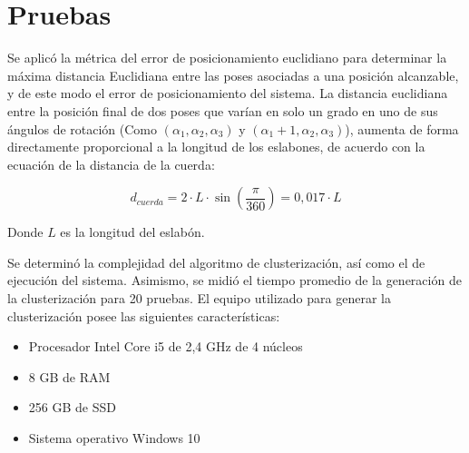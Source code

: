 \section{Pruebas}

Se aplicó la métrica del error de posicionamiento euclidiano para determinar la máxima distancia Euclidiana entre las poses asociadas a una posición alcanzable, y de este modo el error de posicionamiento del sistema. La distancia euclidiana entre la posición final de dos poses que varían en solo un grado en uno de sus ángulos de rotación (Como $(\alpha_1,\alpha_2,\alpha_3)$ y $(\alpha_1 + 1, \alpha_2, \alpha_3)$), aumenta de forma directamente proporcional a la longitud de los eslabones, de acuerdo con la ecuación de la distancia de la cuerda:

\begin{equation}
	d_{cuerda} = 2 \cdot L \cdot \sin(\frac{\pi}{360}) = 0,017 \cdot L
\end{equation}

Donde $L$ es la longitud del eslabón.

Se determinó la complejidad del algoritmo de clusterización, así como el de ejecución del sistema. Asimismo, se midió el tiempo promedio de la generación de la clusterización para 20 pruebas. El equipo utilizado para generar la clusterización posee las siguientes características:

\begin{itemize}
	\item Procesador Intel Core i5 de 2,4 GHz de 4 núcleos
	\item 8 GB de RAM
	\item 256 GB de SSD
	\item Sistema operativo Windows 10
\end{itemize}


